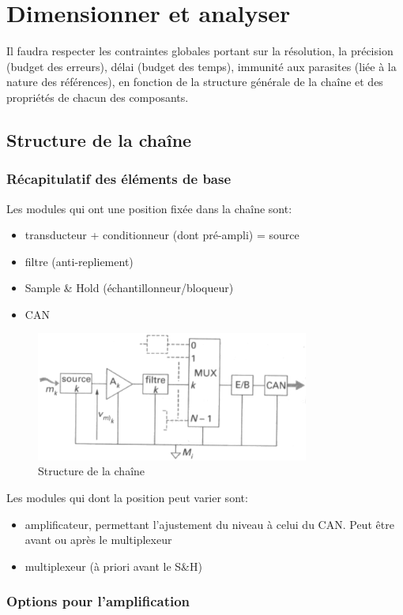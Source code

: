 \chapter{Dimensionner et analyser}
Il faudra respecter les contraintes globales portant sur la résolution, la précision (budget des erreurs), délai (budget des temps), immunité aux parasites (liée à la nature des références), en fonction de la structure générale de la chaîne et des propriétés de chacun des composants.
\section{Structure de la chaîne}
\subsection{Récapitulatif des éléments de base}
Les modules qui ont une position fixée dans la chaîne sont:
\begin{itemize}
	\item transducteur + conditionneur (dont pré-ampli) = source
	\item filtre (anti-repliement)
	\item Sample \& Hold (échantillonneur/bloqueur)
	\item CAN
\end{itemize}
\begin{figure}[H] 
	\centering 
	\includegraphics[width=0.8\textwidth,height=10\baselineskip,keepaspectratio]{ch6/image1} 
	\caption{Structure de la chaîne} 
	\label{fig:strucchain}
\end{figure}
Les modules qui dont la position peut varier sont:
\begin{itemize}
	\item amplificateur, permettant l'ajustement du niveau à celui du CAN. Peut être avant ou après le multiplexeur
	\item multiplexeur (à priori avant le S\&H)
\end{itemize}
\subsection{Options pour l'amplification}
